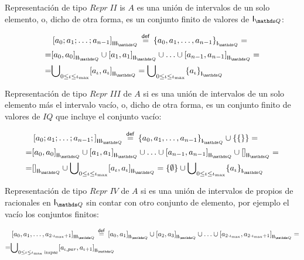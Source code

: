 \documentclass[final,12pt,a4paper,twoside,fleqn]{extbook}
\newcommand{\mathdef}{\ensuremath{\stackrel{\mathsf{def}}{{}={}}}}
\newcommand{\set}[1]{\ensuremath{\left\lbrace{#1}\right\rbrace}}
\theoremstyle{definition}
\theoremstyle{remark}
\begin{document}
	Representación de tipo \(Repr\;II\) is \(A\) es una unión de intervalos
de un solo elemento, o, dicho de otra forma, es un conjunto finito de valores
de \(\IQ\):


\begin{eqnarray}
\nonumber
{}&\left[{a_0;a_1;\ldots;a_{n-1}}\right]_{\IIIQ} \mathdef
{\set{a_0,a_1,\ldots,a_{n-1}}}_{\IQ} = \\ \nonumber
=&{\left[{a_0,a_0}\right]}_{\IIQ}\cup{\left[{a_1,a_1}\right]}_{\IIQ}\cup
\ldots\cup{\left[{a_{n-1},a_{n-1}}\right]}_{\IIQ}=\\ \nonumber
=&{\bigcup}_{0\leq{\iota}\leq{{\iota}_{\max}}}
{\left[{a_{\iota},a_{\iota}}\right]}_{\IIQ} =
{\bigcup}_{0\leq{\iota}\leq{{\iota}_{\max}}}
{\set{a_{\iota}}}_{\IQ}
\end{eqnarray}



Representación de tipo \(Repr\;III\) de \(A\) si es una unión de intervalos
de un solo elemento más el intervalo vacío, o, dicho de otra forma, es un
conjunto finito de valores de \(IQ\) que incluye el conjunto vacío:



\begin{align}
\nonumber
{}&\left[{a_0;a_1;\ldots;a_{n-1}};\right]_{\IIIQ} \mathdef
{\set{a_0,a_1,\ldots,a_{n-1}}}_{\IQ} \cup \set{\set{}} = \\ \nonumber
=&{\left[{a_0,a_0}\right]}_{\IIQ}\cup{\left[{a_1,a_1}\right]}_{\IIQ}
\cup\ldots\cup{\left[{a_{n-1},a_{n-1}}\right]}_{\IIQ}\cup
{\left[\right]}_{\IIQ}=\\ \nonumber
=& {\left[\right]}_{\IIQ} \cup {\bigcup}_{0\leq{\iota}\leq{{\iota}_{\max}}}
{\left[{a_{\iota},a_{\iota}}\right]}_{\IIQ} =
\set{\emptyset}\cup{\bigcup}_{0\leq{\iota}\leq{{\iota}_{\max}}}
{\set{a_{\iota}}}_{\IQ}
\end{align}



	Representación de tipo \(Repr\;IV\) de \(A\) si es una unión de
intervalos de propios de racionales en \({\IQ}\) sin contar con otro conjunto
de elemento, por ejemplo el vacío los conjuntos finitos:



\begin{align}
\nonumber
{}&\left[{a_0,a_1,\ldots,a_{2\cdot{{{\iota}_{\max}+1}}}}\right]_{\IIIQ}
\mathdef {\left[{a_0,a_1}\right]}_{\IIQ}\cup{\left[{a_2,a_3}\right]}_{\IIQ}
\cup\ldots\cup{\left[a_{2\cdot{{\iota}_{\max}}},a_{2\cdot{{\iota}_{\max}} 
+1}\right]}_{\IIQ}=\\ \nonumber
=&{\bigcup}_{0\leq{\iota}\lneq{{\iota}_{\max} \text{ impar}}}
{\left[{a_{\iota,par},a_{\iota+1}}\right]}_{\IIQ}
\end{align}
\end{document}
